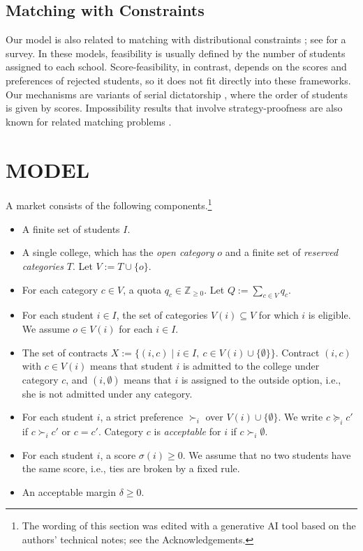 \documentclass[a4paper,twoside]{article}
\theoremstyle{definition}
\newcommand{\aiedit}{\footnote{The wording of this section was edited with a generative AI tool \cite{Anthropic26a} based on the authors' technical notes; see the Acknowledgements.}}
\begin{document}
\subsection{Matching with Constraints}

Our model is also related to matching with distributional constraints
\cite{KaKo15a,GKK+17a,KTY18a}; see \cite{ABY22a} for a survey.
In these models, feasibility is usually defined by the number of students assigned to
each school. Score-feasibility, in contrast, depends on the scores and preferences of
rejected students, so it does not fit directly into these frameworks.
Our mechanisms are variants of serial dictatorship \cite{AbSo98a}, where the order of
students is given by scores.
Impossibility results that involve strategy-proofness are also known for related matching
problems \cite{Koji12a,CKM+22a}.

\section{\uppercase{Model}}
\label{sec:model}

A market consists of the following components.\aiedit{}
\begin{itemize}
\item A finite set of students $I$.
\item A single college, which has the \emph{open category} $o$ and a finite set of
\emph{reserved categories} $T$. Let $V:=T\cup\{o\}$.
\item For each category $c\in V$, a quota $q_c\in\mathbb{Z}_{\ge 0}$.
Let $Q:=\sum_{c\in V}q_c$.
\item For each student $i\in I$, the set of categories $V(i)\subseteq V$ for which $i$
is eligible. We assume $o\in V(i)$ for each $i\in I$.
\item The set of contracts
$X:=\{(i,c)\mid i\in I,\ c\in V(i)\cup\{\emptyset\}\}$.
Contract $(i,c)$ with $c\in V(i)$ means that student $i$ is admitted to the college under
category $c$, and $(i,\emptyset)$ means that $i$ is assigned to the outside option,
i.e., she is not admitted under any category.
\item For each student $i$, a strict preference $\succ_i$ over
$V(i)\cup\{\emptyset\}$. We write $c\succeq_i c'$ if $c\succ_i c'$ or $c=c'$.
Category $c$ is \emph{acceptable} for $i$ if $c\succ_i\emptyset$.
\item For each student $i$, a score $\sigma(i)\ge 0$. We assume that no two students
have the same score, i.e., ties are broken by a fixed rule.
\item An acceptable margin $\delta\ge 0$.
\end{itemize}
\end{document}
